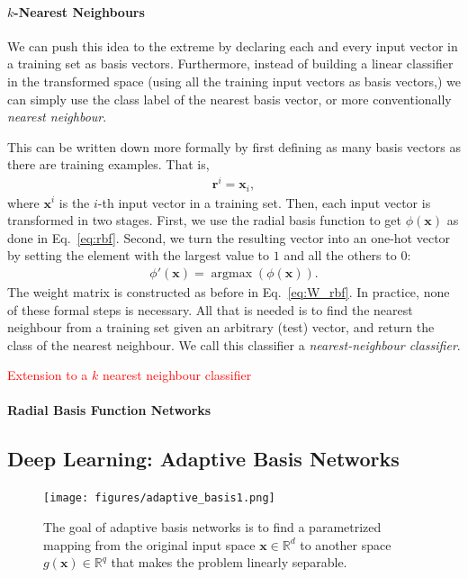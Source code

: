 \documentclass{report}
\newcommand{\vect}[1]{\mathbf{#1}}
\newcommand{\vx}[0]{\vect{x}}
\newcommand{\vr}[0]{\vect{r}}
\newcommand{\todo}[1]{{\Large\textcolor{red}{#1}}}
\DeclareMathOperator*{\argmax}{\arg \max}
\begin{document}
\paragraph{$k$-Nearest Neighbours}

We can push this idea to the extreme by declaring each and every input vector in
a training set as basis vectors. Furthermore, instead of building a linear
classifier in the transformed space (using all the training input vectors as
basis vectors,) we can simply use the class label of the nearest basis vector,
or more conventionally {\it nearest neighbour}. 

This can be written down more formally by first defining as many basis vectors
as there are training examples. That is,
\begin{align*}
    \vr^i = \vx_i,
\end{align*}
where $\vx^i$ is the $i$-th input vector in a training set. Then, each input
vector is transformed in two stages. First, we use the radial basis function to
get $\phi(\vx)$ as done in Eq.~\eqref{eq:rbf}. Second, we turn the resulting
vector into an one-hot vector by setting the element with the largest value to
$1$ and all the others to $0$:
\begin{align*}
    \phi'(\vx) = \argmax(\phi(\vx)).
\end{align*}
The weight matrix is constructed as before in Eq.~\eqref{eq:W_rbf}.
In practice, none of these formal steps is necessary. All that is needed is to
find the nearest neighbour from a training set given an arbitrary (test) vector,
and return the class of the nearest neighbour. We call this classifier a {\it
nearest-neighbour classifier}.

\todo{Extension to a $k$ nearest neighbour classifier}

\paragraph{Radial Basis Function Networks}

\todo{}






\subsection{Deep Learning: Adaptive Basis Networks}

\begin{figure}
    \centering
    \begin{minipage}{0.6\textwidth}
        \centering
        \texttt{[image: figures/adaptive\_basis1.png]}
    \end{minipage}
    \begin{minipage}{0.39\textwidth}
        \caption{
            \label{fig:feature_extraction}
            The goal of adaptive basis networks is to find a parametrized
            mapping from the original input space $\vx \in \mathbb{R}^d$ to
            another space $g(\vx) \in \mathbb{R}^q$ that makes the problem
            linearly separable. 
        }
    \end{minipage}
\end{figure}
\end{document}
